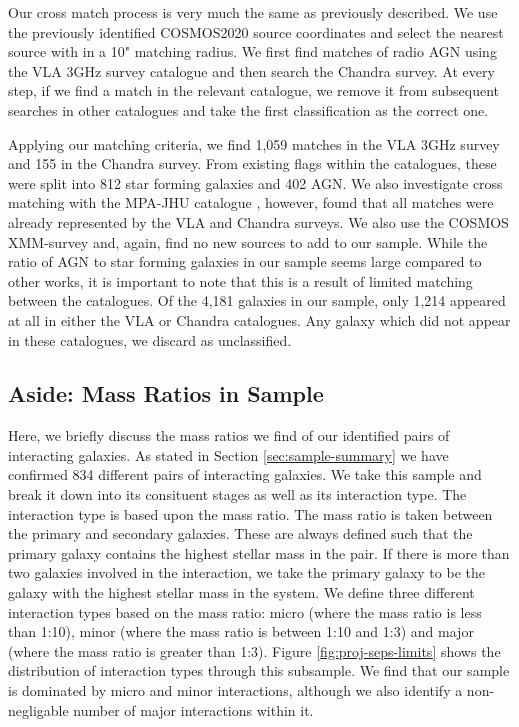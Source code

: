 Our cross match process is very much the same as previously described. We use the previously identified COSMOS2020 source coordinates and select the nearest source with in a 10" matching radius. We first find matches of radio AGN using the VLA 3GHz survey catalogue and then search the Chandra survey. At every step, if we find a match in the relevant catalogue, we remove it from subsequent searches in other catalogues and take the first classification as the correct one.

Applying our matching criteria, we find 1,059 matches in the VLA 3GHz survey and 155 in the Chandra survey. From existing flags within the catalogues, these were split into 812 star forming galaxies and 402 AGN. We also investigate cross matching with the MPA-JHU catalogue \citep{2003MNRAS.341...33K, 2004MNRAS.351.1151B, 2007ApJS..173..267S}, however, found that all matches were already represented by the VLA and Chandra surveys. We also use the COSMOS XMM-survey and, again, find no new sources to add to our sample. While the ratio of AGN to star forming galaxies in our sample seems large compared to other works, it is important to note that this is a result of limited matching between the catalogues. Of the 4,181 galaxies in our sample, only 1,214 appeared at all in either the VLA or Chandra catalogues. Any galaxy which did not appear in these catalogues, we discard as unclassified. 

\subsection{Aside: Mass Ratios in Sample}
Here, we briefly discuss the mass ratios we find of our identified pairs of interacting galaxies. As stated in Section \ref{sec:sample-summary} we have confirmed 834 different pairs of interacting galaxies. We take this sample and break it down into its consituent stages as well as its interaction type. The interaction type is based upon the mass ratio. The mass ratio is taken between the primary and secondary galaxies. These are always defined such that the primary galaxy contains the highest stellar mass in the pair. If there is more than two galaxies involved in the interaction, we take the primary galaxy to be the galaxy with the highest stellar mass in the system. We define three different interaction types based on the mass ratio: micro (where the mass ratio is less than 1:10), minor (where the mass ratio is between 1:10 and 1:3) and major (where the mass ratio is greater than 1:3). Figure \ref{fig:proj-seps-limits} shows the distribution of interaction types through this subsample. We find that our sample is dominated by micro and minor interactions, although we also identify a non-negligable number of major interactions within it.

